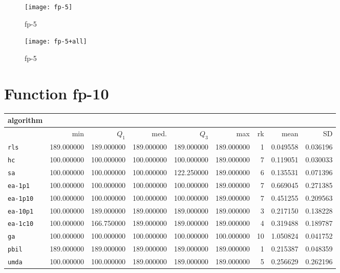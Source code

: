 \begin{center}
\begin{figure}[h]
\centering
\texttt{[image: fp-5]}
\caption{fp-5}
\end{figure}
\end{center}

\begin{center}
\begin{figure}[h]
\centering
\texttt{[image: fp-5+all]}
\caption{fp-5}
\end{figure}
\end{center}

\newpage

\section{Function fp-10}
\begin{center}
\begin{tabular}{@{}l*{5}{>{{}}N{3}{0}}>{{}}N{2}{0}N{1}{3}N{1}{3}@{}}
\toprule
{algorithm} &  &  \\
\midrule
& {min} & {$Q_1$} & {med.} & {$Q_3$} & {max} & {rk} & {mean} & {SD} \\
\midrule
\verb|rls| & {\color{blue}} 189.000000 & {\color{blue}} 189.000000 & {\color{blue}} 189.000000 & {\color{blue}} 189.000000 & {\color{blue}} 189.000000 & 1 & 0.049558 & 0.036196 \\
 \verb|hc| & 100.000000 & 100.000000 & 100.000000 & 100.000000 & {\color{blue}} 189.000000 & 7 & 0.119051 & 0.030033 \\
 \verb|sa| & 100.000000 & 100.000000 & 100.000000 & 122.250000 & {\color{blue}} 189.000000 & 6 & 0.135531 & 0.071396 \\
 \verb|ea-1p1| & 100.000000 & 100.000000 & 100.000000 & 100.000000 & {\color{blue}} 189.000000 & 7 & 0.669045 & 0.271385 \\
 \verb|ea-1p10| & 100.000000 & 100.000000 & 100.000000 & 100.000000 & {\color{blue}} 189.000000 & 7 & 0.451255 & 0.209563 \\
 \verb|ea-10p1| & 100.000000 & {\color{blue}} 189.000000 & {\color{blue}} 189.000000 & {\color{blue}} 189.000000 & {\color{blue}} 189.000000 & 3 & 0.217150 & 0.138228 \\
 \verb|ea-1c10| & 100.000000 & 166.750000 & {\color{blue}} 189.000000 & {\color{blue}} 189.000000 & {\color{blue}} 189.000000 & 4 & 0.319488 & 0.189787 \\
 \verb|ga| & 100.000000 & 100.000000 & 100.000000 & 100.000000 & 100.000000 & 10 & 1.050824 & 0.041752 \\
 \verb|pbil| & {\color{blue}} 189.000000 & {\color{blue}} 189.000000 & {\color{blue}} 189.000000 & {\color{blue}} 189.000000 & {\color{blue}} 189.000000 & 1 & 0.215387 & 0.048359 \\
 \verb|umda| & 100.000000 & 100.000000 & {\color{blue}} 189.000000 & {\color{blue}} 189.000000 & {\color{blue}} 189.000000 & 5 & 0.256629 & 0.262196 \\
 \bottomrule
\end{tabular}
\end{center}

